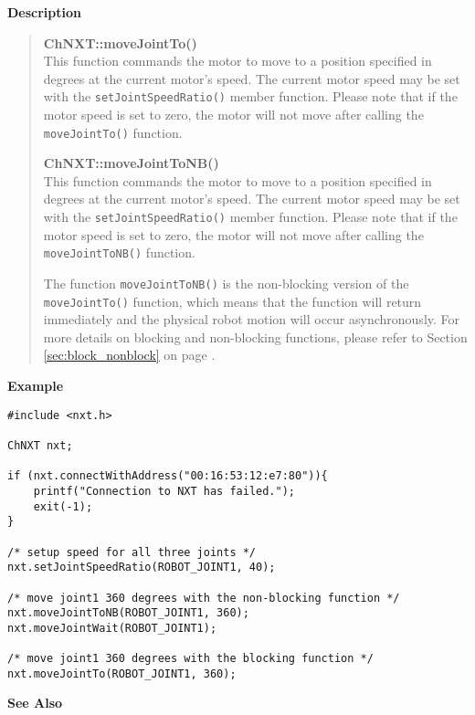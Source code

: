 \noindent
{\bf Description}\\
\vspace{-12pt}
\begin{quote}
{\bf ChNXT::moveJointTo()}\\
This function commands the motor to move to a position specified 
in degrees at the current motor's speed. The current motor speed 
may be set with the \texttt{setJointSpeedRatio()} member function.
Please note that if the motor speed is set to zero, the motor will
not move after calling the \texttt{moveJointTo()} function. 

{\bf ChNXT::moveJointToNB()}\\
This function commands the motor to move to a position specified 
in degrees at the current motor's speed. The current motor speed 
may be set with the \texttt{setJointSpeedRatio()} member function.
Please note that if the motor speed is set to zero, the motor will
not move after calling the \texttt{moveJointToNB()} function. 

The function \texttt{moveJointToNB()} is the non-blocking version 
of the \texttt{moveJointTo()} function, which means that the 
function will return immediately and the physical robot motion 
will occur asynchronously. For more details on blocking and 
non-blocking functions, please refer to Section \ref{sec:block_nonblock}
on page \pageref{sec:block_nonblock}.\\
\end{quote}

\noindent
{\bf Example}
\begin{verbatim}
#include <nxt.h> 

ChNXT nxt;

if (nxt.connectWithAddress("00:16:53:12:e7:80")){
    printf("Connection to NXT has failed.");
    exit(-1);
}
 
/* setup speed for all three joints */
nxt.setJointSpeedRatio(ROBOT_JOINT1, 40);

/* move joint1 360 degrees with the non-blocking function */
nxt.moveJointToNB(ROBOT_JOINT1, 360);
nxt.moveJointWait(ROBOT_JOINT1);

/* move joint1 360 degrees with the blocking function */
nxt.moveJointTo(ROBOT_JOINT1, 360);
\end{verbatim}

\noindent
{\bf See Also}\\
